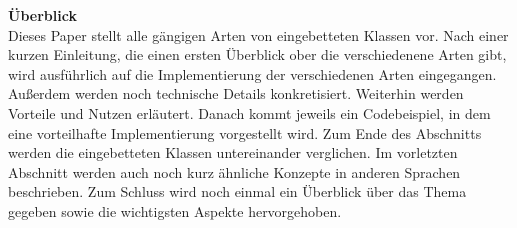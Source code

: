\vspace*{2cm}
{\bf\Large Überblick} \\ [1em]
Dieses Paper stellt alle gängigen Arten von eingebetteten Klassen vor. Nach einer kurzen
Einleitung, die einen ersten Überblick ober die verschiedenene Arten gibt, wird ausführlich
auf die Implementierung der verschiedenen Arten eingegangen. Außerdem werden noch
technische Details konkretisiert. Weiterhin werden Vorteile und Nutzen erläutert. Danach
kommt jeweils ein Codebeispiel, in dem eine vorteilhafte Implementierung vorgestellt wird.
Zum Ende des Abschnitts werden die eingebetteten Klassen untereinander verglichen.
Im vorletzten Abschnitt werden auch noch kurz ähnliche Konzepte in anderen Sprachen beschrieben. Zum
Schluss wird noch einmal ein Überblick über das Thema gegeben sowie die wichtigsten
Aspekte hervorgehoben.


\clearpage
